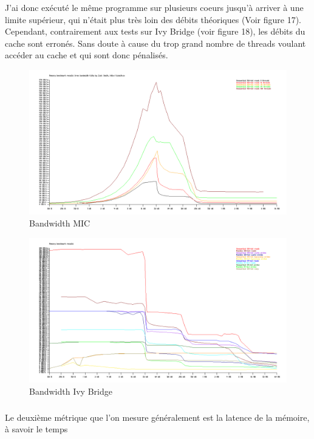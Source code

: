 \documentclass[11pt]{article}
\begin{document}
					J'ai donc exécuté le même programme sur plusieurs coeurs jusqu'à arriver à une limite supérieur, qui 
					n'était plus très loin des débits théoriques (Voir figure 17). Cependant, contrairement aux tests sur 
					Ivy Bridge (voir figure 18), les débits du cache sont erronés. Sans doute à cause du trop grand nombre 
					de threads voulant accéder au cache et qui sont donc pénalisés.
					\begin{figure}
					\begin{center}
					\includegraphics[scale=0.33]{bandwidth_MICO3.png}
					\caption{Bandwidth MIC}
					\end{center}
					\end{figure}
					\begin{figure}
					\begin{center}
					\includegraphics[scale=0.33]{bandwidth_IVYO3.png}
					\caption{Bandwidth Ivy Bridge}
					\end{center}
					\end{figure}
					\subparagraph{}
					Le deuxième métrique que l'on mesure généralement est la latence de la mémoire, à savoir le temps
\end{document}
